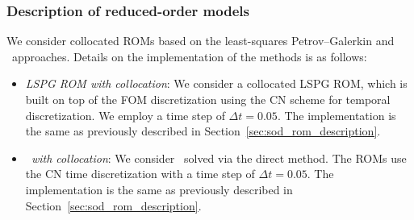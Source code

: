 \subsubsection{Description of reduced-order models}
We consider collocated ROMs based on the least-squares Petrov--Galerkin and \methodAcronym\ approaches. Details on the implementation of the methods is as follows:
\begin{itemize}

\item \textit{LSPG ROM with collocation}: We consider a collocated LSPG ROM, which is built on top of the FOM discretization using the CN scheme for temporal 
discretization. We employ a time step of $\Delta t  = 0.05$. The implementation is the same as previously described in Section~\ref{sec:sod_rom_description}. 
 
\item \textit{\methodAcronymROMs\ with collocation}: We consider \methodAcronymROMs\ solved via the direct method. The ROMs use the CN time discretization with a time step of 
$\Delta t = 0.05$. The implementation is the same as previously described in Section~\ref{sec:sod_rom_description}. 
\end{itemize}


